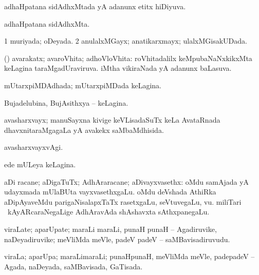 \bentry
{}
\gl{\gu}
\bmng
adhaHpatana sidAdhxMtada yA adanunx etitx hiDiyuva. 
\emng
\eentry

\bentry
{}
\gl{\nA}
\bmng
adhaHpatana sidAdhxMta. 
\emng
\eentry

\bentry
{}
\gl{\gu}
\bmng
\bnum
\num{1} muriyada; oDeyada. 
\num{2} anulalxMGayx; anatikarxmayx; ulalxMGisakUDada. 
\enum
\emng
\eentry

\bentry
{}
\gl{\gu}
\bmng
(\Bwvi) avarakatx; avaroVhita; adhoVloVhita: 
\banum
{} roVhitadalilx keMpubaNaNxkikxMta keLagina taraMgadUraviruva. 
 iMtha vikiraNada yA adanunx baLasuva. 
\eanum
\emng
\eentry

\bentry
{}
\gl{\gu}
\bmng
mUtarxpiMDAdhada; mUtarxpiMDada keLagina. 
\emng
\eentry

\bentry
{}
\gl{\gu}
\bmng
Bujadelubina, BujAsithxya -- keLagina. 
\emng
\eentry

\bentry
{}
\gl{\gu}
\bmng
avasharxvayx; manuSayxna kivige keVLisadaSuTx keLa AvataRnada dhavxnitaraMgagaLa yA avakekx saMbaMdhisida. 
\emng
\eentry

\bentry
{}
\gl{\kirxvi}
\bmng
avasharxvayxvAgi. 
\emng
\eentry

\bentry
{}
\gl{\gu}
\bmng
ede mULeya keLagina. 
\emng
\eentry

\bentry
{}
\gl{\nA}
\bmng
aDi racane; aDigaTuTx; AdhAraracane; aDivayxvasethx: 
\banum
{} oMdu samAjada yA udayxmada mUlaBUta vayxvasethxgaLu. 
 oMdu deVshada AthiRka aDipAyaveMdu parigaNisalapxTaTx rasetxgaLu, seVtuvegaLu, \mo vu. 
 miliTari \mo\ kAyARcaraNegaLige AdhAravAda shAshavxta sAthxpanegaLu. 
\eanum
\emng
\eentry

\bentry
{}
\gl{\nA}
\bmng
viraLate; aparUpate; maraLi maraLi, punaH punaH -- Agadiruvike, naDeyadiruvike; meVliMda meVle, padeV padeV -- saMBavisadiruvudu. 
\emng
\eentry

\bentry
{}
\gl{\gu}
\bmng
viraLa; aparUpa; maraLimaraLi; punaHpunaH, meVliMda meVle, padepadeV -- Agada, naDeyada, saMBavisada, GaTisada. 
\emng
\eentry

